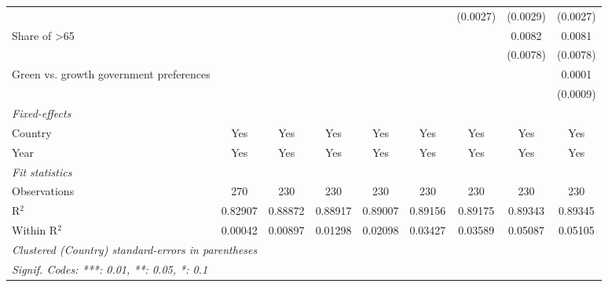 \begin{table}[htbp]
\begin{tabular}{lcccccccc}
                                                            &          &          &          &          &          & (0.0027) & (0.0029) & (0.0027)\\   
      Share of >65                                          &          &          &          &          &          &          & 0.0082   & 0.0081\\   
                                                            &          &          &          &          &          &          & (0.0078) & (0.0078)\\   
      Green vs. growth government preferences               &          &          &          &          &          &          &          & 0.0001\\   
                                                            &          &          &          &          &          &          &          & (0.0009)\\   
      \midrule
      \emph{Fixed-effects}\\
      Country                                               & Yes      & Yes      & Yes      & Yes      & Yes      & Yes      & Yes      & Yes\\  
      Year                                                  & Yes      & Yes      & Yes      & Yes      & Yes      & Yes      & Yes      & Yes\\  
      \midrule
      \emph{Fit statistics}\\
      Observations                                          & 270      & 230      & 230      & 230      & 230      & 230      & 230      & 230\\  
      R$^2$                                                 & 0.82907  & 0.88872  & 0.88917  & 0.89007  & 0.89156  & 0.89175  & 0.89343  & 0.89345\\  
      Within R$^2$                                          & 0.00042  & 0.00897  & 0.01298  & 0.02098  & 0.03427  & 0.03589  & 0.05087  & 0.05105\\  
      \midrule \midrule
      \multicolumn{9}{l}{\emph{Clustered (Country) standard-errors in parentheses}}\\
      \multicolumn{9}{l}{\emph{Signif. Codes: ***: 0.01, **: 0.05, *: 0.1}}\\
   \end{tabular}
\end{table}


